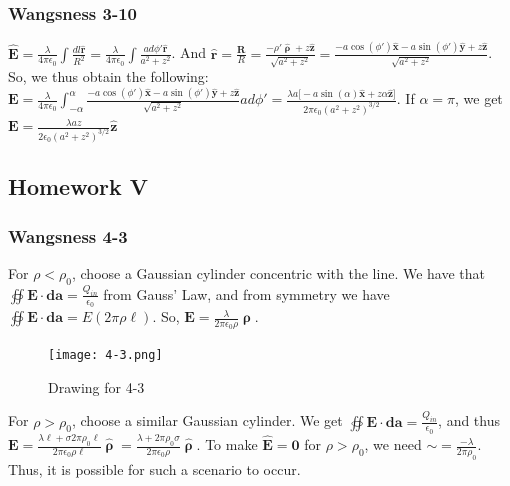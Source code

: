 \documentclass[oneside]{book}
\theoremstyle{mystyle}
\begin{document}
\subsubsection{Wangsness 3-10}
$\hat{\mathbf{E}} = \frac{\lambda}{4\pi\epsilon_0} \int \frac{dl \hat{\mathbf{r}}}{R^2} = \frac{\lambda}{4\pi \epsilon_0} \int \frac{ad\phi' \hat{\mathbf{r}}}{a^2+z^2}$. And $\hat{\mathbf{r}} = \frac{\mathbf{R}}{R} = \frac{-\rho' \hat{\boldsymbol{\uprho}}+z\hat{\mathbf{z}}}{\sqrt{a^2+z^2}} = \frac{-a\cos(\phi')\hat{\mathbf{x}}-a\sin(\phi')\hat{\mathbf{y}}+z\hat{\mathbf{z}}}{\sqrt{a^2+z^2}}$. So, we thus obtain the following: \\ $\mathbf{E} = \frac{\lambda}{4\pi \epsilon_0} \int_{-\alpha}^{\alpha} \frac{-a\cos(\phi')\hat{\mathbf{x}}-a\sin(\phi')\hat{\mathbf{y}}+z\hat{\mathbf{z}}}{\sqrt{a^2+z^2}}ad\phi' = \frac{\lambda a\big[ -a\sin(\alpha)\hat{\mathbf{x}}+z\alpha \hat{\mathbf{z}}\big]}{2\pi \epsilon_0 (a^2+z^2)^{3/2}}$. If $\alpha = \pi$, we get $\mathbf{E} = \frac{\lambda a z}{2\epsilon_0 (a^2+z^2)^{3/2}}\hat{\mathbf{z}}$
\subsection{Homework V}
\subsubsection{Wangsness 4-3}
For $\rho<\rho_0$, choose a Gaussian cylinder concentric with the line. We have that $\oiint \mathbf{E}\cdot \mathbf{da} = \frac{Q_{in}}{\epsilon_0}$ from Gauss' Law, and from symmetry we have $\oiint \mathbf{E}\cdot \mathbf{da} = E(2\pi \rho \ell)$. So, $\mathbf{E} = \frac{\lambda}{2\pi \epsilon_0 \rho}\hat{\boldsymbol{\uprho}}$.
\begin{figure}[htbp]
\begin{center}
\texttt{[image: 4-3.png]}
\end{center}
\caption{Drawing for 4-3}
\end{figure}
For $\rho>\rho_0$, choose a similar Gaussian cylinder. We get $\oiint \mathbf{E}\cdot \mathbf{da} = \frac{Q_{in}}{\epsilon_0}$, and thus $\mathbf{E} = \frac{\lambda \ell + \sigma 2\pi \rho_0 \ell}{2\pi \epsilon_0 \rho \ell}\hat{\boldsymbol{\uprho}} = \frac{\lambda+2\pi \rho_0 \sigma}{2\pi \epsilon_0 \rho}\hat{\boldsymbol{\uprho}}$. To make $\hat{\mathbf{E}} = \mathbf{0}$ for $\rho>\rho_0$, we need $\sim = \frac{-\lambda}{2\pi \rho_0}$. Thus, it is possible for such a scenario to occur.
\end{document}
